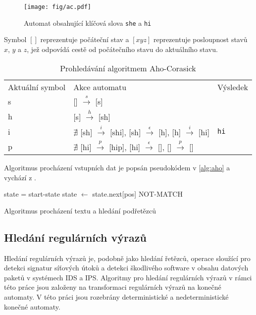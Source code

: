 \begin{figure}[!htbp]
    \centering
    \texttt{[image: fig/ac.pdf]}
    \caption{Automat obsahující klíčová slova \texttt{she} a \texttt{hi}}
    \label{fig:ac}
\end{figure}

Symbol $[]$ reprezentuje počáteční stav a $[xyz]$ reprezentuje posloupnost stavů $x$, $y$ a $z$, jež odpovídá cestě od
počátečního stavu do aktuálního stavu.

\begin{table}[!htbp]
	\center
    \begin{tabular}{|l|l|l|}
    \hline
    Aktuální symbol & Akce automatu & Výsledek \\ \hhline{|=|=|=|}
    s & [] $\overset{s}{\rightarrow}$ [s] &  \\ \hline
    h & [s] $\overset{h}{\rightarrow}$ [sh] & \\ \hline
    i & $\nexists$ [sh] $\overset{i}{\rightarrow}$ [shi], [sh] $\overset{\epsilon}{\rightarrow}$ [h], [h] $\overset{i}{\rightarrow}$ [hi] & \texttt{hi} \\ \hline
    p & $\nexists$ [hi] $\overset{p}{\rightarrow}$ [hip], [hi] $\overset{\epsilon}{\rightarrow}$ [], [] $\overset{p}{\rightarrow}$ [] &  \\ \hline
    \end{tabular}
    \caption{Prohledávání algoritmem Aho-Corasick}
	\label{tab:pm-match}
\end{table}


Algoritmus procházení vstupních dat je popsán pseudokódem v \ref{alg:aho} a vychází z \cite{aho}.

\begin{algorithm}[!htbp]
	state = start-state\;
	{
        state $\leftarrow$ state.next[pos]\;
	}
	\Return NOT-MATCH\;
	\caption{Algoritmus procházení textu a hledání podřetězců}
    \label{alg:aho}
\end{algorithm}

\subsection{Hledání regulárních výrazů}\label{sec:regex} %

Hledání regulárních výrazů je, podobně jako hledání řetězců, operace sloužící pro detekci signatur
síťových útoků a detekci škodlivého software v obsahu datových paketů v systémech IDS a IPS.
Algoritmy pro hledání regulárních výrazů v rámci této práce jsou založeny na transformaci
regulárních výrazů na konečné automaty.
V této práci jsou rozebrány deterministické a nedeterministické konečné automaty.

